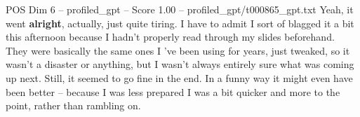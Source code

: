 \begin{textsample}{POS Dim 6 – profiled\_gpt – Score 1.00 – profiled\_gpt/t000865\_gpt.txt}  \label{ex:f6_pos_035}
Yeah, it went \textbf{alright}, actually, just quite tiring.
I have to admit I sort of blagged it a bit this afternoon because I hadn't properly read through my slides beforehand.
They were basically the same ones I ’ve been using for years, just tweaked, so it wasn't a disaster or anything, but I wasn't always entirely sure what was coming up next.
Still, it seemed to go fine in the end.
In a funny way it might even have been better – because I was less prepared I was a bit quicker and more to the point, rather than rambling on.

\end{textsample}

